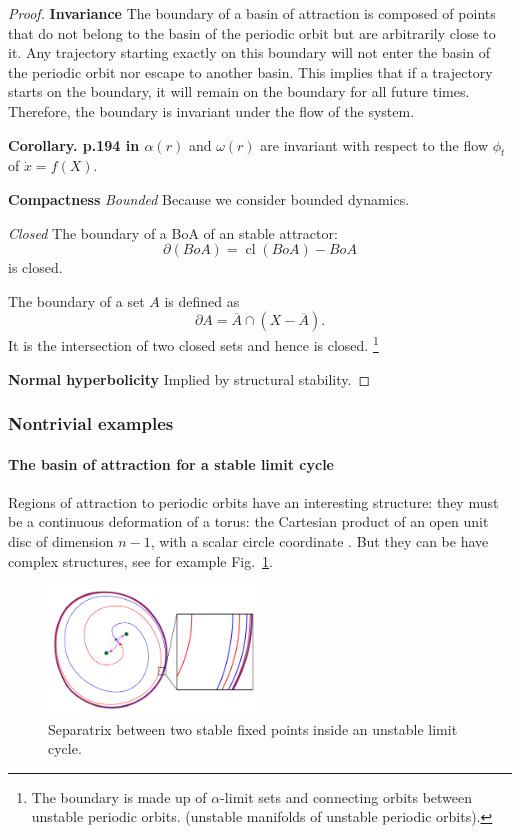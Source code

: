\documentclass{article}
\newcommand{\cl}{\operatorname{cl}}
\newcounter{ct}
\begin{document}
\begin{proof}
\textbf{Invariance}
The boundary of a basin of attraction is composed of points that do not belong to the basin of the periodic orbit but are arbitrarily close to it.
 Any trajectory starting exactly on this boundary will not enter the basin of the periodic orbit nor escape to another basin.
This implies that if a trajectory starts on the boundary, it will remain on the boundary for all future times. Therefore, the boundary is invariant under the flow of the system.


\textbf{Corollary. p.194 in  \citep{perko2013differential}} \( \alpha(r) \) and \( \omega(r) \) are invariant with respect to the flow \( \phi_t \) of \(\dot x = f(X)\). %

\textbf{Compactness}
\textit{Bounded} Because we consider bounded dynamics.

\textit{Closed} 
The boundary of a BoA of an stable attractor:
\[\partial(BoA) = \cl(BoA) -  BoA\]
is closed.

The boundary of a set \( A \) is defined as 
\[
\partial A = \overline{A} \cap (X - \overline{A}).
\]
It is the intersection of two closed sets and hence is closed.
\footnote{
The boundary is made up of 
$\alpha$-limit sets 
and
connecting orbits between unstable periodic orbits.
(unstable manifolds of unstable periodic orbits).
}


\textbf{Normal hyperbolicity}
Implied by structural stability.

\end{proof}

\subsubsection{Nontrivial examples}

\paragraph{The basin of attraction for a stable limit cycle}%
Regions of attraction to periodic orbits have an interesting structure: they must be a continuous deformation of a torus: the Cartesian product of an open unit disc of dimension $n-1$, with a scalar circle coordinate  \citep{wilson1967structure}.
But they can be have complex structures, see for example Fig.~\ref{fig:unstab_lc_3fps}.

\setlength\belowcaptionskip{-5ex}
\begin{figure}
  \centering
  \includegraphics[width=0.5\textwidth]{unstab_lc_3fps}
  \caption{Separatrix between two stable fixed points inside an unstable limit cycle.
  }\label{fig:unstab_lc_3fps}
\end{figure}
\end{document}
